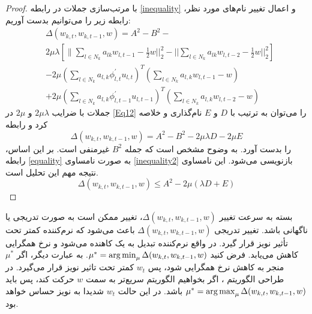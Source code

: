 \begin{proof}
	با مرتب‌سازی جملات در رابطه \ref{inequality} و اعمال تغییر نام‌های مورد نظر، رابطه زیر را می‌توانیم بدست آوریم:
	\begin{equation}\label{Eq12}
		\begin{split}
			&\Delta(w_{k,t},w_{k,t-1},w)=A^2-B^2-\\
			&2\mu\lambda \left[\lVert\sum_{l\in N_k} a_{lk}w_{l,t-1}-\frac{1}{2}w\rvert\rvert^2_2-\lvert\lvert\sum_{l\in N_k} a_{lk}w_{l,t-2}-\frac{1}{2}w\rvert\rvert^2_2\right]\\
			&-2\mu\left(\sum_{l\in N_k}a_{l,k}\phi^{'}_{l,t}u_{l,t}\right)^T\left(\sum_{l\in N_k}a_{l,k}w_{l,t-1}-w\right)\\
			&+2\mu\left(\sum_{l\in N_k}a_{l,k}\phi^{'}_{l,t-1}u_{l,t-1}\right)^T\left(\sum_{l\in N_k}a_{l,k}w_{l,t-2}-w\right)
		\end{split}	
	\end{equation}
	جملات با ضرایب $2\mu\lambda$ و $2\mu$ در \ref{Eq12} را می‌توان به ترتیب با $D$ و $E$ نام‌گذاری و خلاصه کرد و رابطه 
	\begin{equation}\label{equality}
		\Delta(w_{k,t},w_{k,t-1},w)=A^2-B^2-2\mu\lambda D-2\mu E
	\end{equation}
	را بدست آورد. به وضوح مشخص است که جمله $B^2$  غیرمنفی است. بر این اساس، رابطه \ref{equality} به صورت نامساوی \ref{inequality2} بازنویسی می‌شود. این نامساوی نتیجه مهم این تحلیل است. 
	\begin{equation}\label{inequality2}
		\Delta(w_{k,t},w_{k,t-1},w)\leq A^2-2\mu (\lambda D+ E)
	\end{equation}
\end{proof}

بسته به سرعت تغییر $\Delta(w_{k,t},w_{k,t-1},w)$، تغییر ممکن است به صورت تدریجی یا ناگهانی باشد. تغییر تدریجی $\Delta(w_{k,t},w_{k,t-1},w)$ باعث می‌شود که نرم‌کننده کمتر تحت تأثیر نویز قرار گیرد. در واقع نرم‌کننده تبدیل به یک کاهنده می‌شود و نرخ همگرایی کاهش می‌یابد. فرض کنید $\mu^*=\operatorname*{arg\,min}_{\mu} \Delta(w_{k,t},w_{k,t-1},w)$. به عبارت دیگر، اگر $\mu^{*}$ منجر به کاهش نرخ همگرایی شود، پس $w_t$ کمتر تحت تاثیر نویز قرار می‌گیرد. در طراحی الگوریتم ، اگر بخواهیم الگوریتم سریع‌تر به سمت $w$ حرکت کند، پس باید $\mu^*=\operatorname*{arg\,max}_{\mu} \Delta(w_{k,t},w_{k,t-1},w)$ باشد. در این حالت $w_t$ شدیدا به نویز حساس خواهد بود. 

